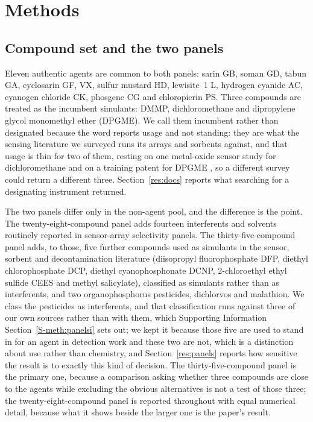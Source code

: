 \documentclass[journal=ancham,manuscript=article,margin=1in]{achemso}
\begin{document}
\section{Methods}

\subsection{Compound set and the two panels}
\label{meth:panels}
Eleven authentic agents are common to both panels: sarin GB, soman GD, tabun GA,
cyclosarin GF, VX, sulfur mustard HD, lewisite~1 L, hydrogen cyanide AC,
cyanogen chloride CK, phosgene CG and chloropicrin PS. Three compounds are
treated as the incumbent simulants: DMMP, dichloromethane and dipropylene glycol
monomethyl ether (DPGME). We call them incumbent rather than designated because
the word reports usage and not standing: they are what the sensing literature we
surveyed runs its arrays and sorbents against, and that usage is thin for two of
them, resting on one metal-oxide sensor study for dichloromethane
\cite{lee2011sno2} and on a training patent for DPGME
\cite{seitzinger2006simulant}, so a different survey could return a different
three. Section~\ref{res:docs} reports what searching for a designating
instrument returned.

The two panels differ only in the non-agent pool, and the difference is the
point. The twenty-eight-compound panel adds fourteen interferents and solvents
routinely reported in sensor-array selectivity panels. The thirty-five-compound
panel adds, to those, five further compounds used as simulants in the sensor,
sorbent and decontamination literature (diisopropyl fluorophosphate DFP, diethyl
chlorophosphate DCP, diethyl cyanophosphonate
DCNP\cite{lee2021tabun,jang2014tabun}, 2-chloroethyl ethyl sulfide CEES and
methyl salicylate), classified as simulants rather than as interferents, and two
organophosphorus pesticides, dichlorvos and malathion. We class the pesticides as
interferents, and that classification runs against three of our own sources
rather than with them, which Supporting Information
Section~\ref{S-meth:panelsi} sets out; we kept it because those five are used to
stand in for an agent in detection work and these two are not, which is a
distinction about use rather than chemistry, and
Section~\ref{res:panels} reports how sensitive the result is to exactly this
kind of decision. The thirty-five-compound panel is the primary one, because a
comparison asking whether three compounds are close to the agents while
excluding the obvious alternatives is not a test of those three; the
twenty-eight-compound panel is reported throughout with equal numerical detail,
because what it shows beside the larger one is the paper's result.
\end{document}
